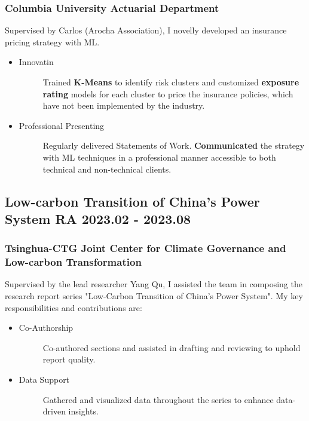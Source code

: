 \documentclass[a4paper]{article}
\begin{document}
\subsubsection{Columbia University Actuarial Department} 
\vspace{3pt}
Supervised by Carlos (Arocha Association), I novelly developed an insurance pricing strategy with ML.
\begin{itemize}
    \item\begin{description}
        \item[Innovatin] Trained \textbf{K-Means} to identify risk clusters and customized \textbf{exposure rating} models for each cluster to price the insurance policies, which have not been implemented by the industry.
    \end{description}
    \item\begin{description}
        \item[Professional Presenting] Regularly delivered Statements of Work. \textbf{Communicated} the strategy with ML techniques in a professional manner accessible to both technical and non-technical clients.
    \end{description}
\end{itemize} 

\subsection{Low-carbon Transition of China's Power System \normalfont \hfill RA \hspace{40pt} 2023.02 - 2023.08} 
\subsubsection{Tsinghua-CTG Joint Center for Climate Governance and Low-carbon Transformation} 
\vspace{3pt}
    Supervised by the lead researcher Yang Qu, I assisted the team in composing the research report series "Low-Carbon Transition of China’s Power System". My key responsibilities and contributions are:

\begin{itemize}
    \item \begin{description}
        \item[Co-Authorship] Co-authored sections and assisted in drafting and reviewing to uphold report quality.
    \end{description}
    \item \begin{description}
        \item[Data Support] Gathered and visualized data throughout the series to enhance data-driven insights.
    \end{description} 
\end{itemize}
\end{document}

